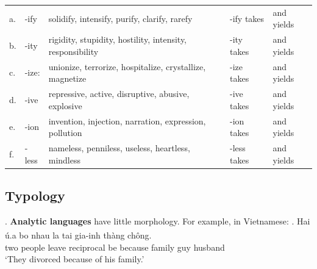 \documentclass[11pt, oneside]{article}   	%
\begin{document}
\medskip %
\begin{adjustwidth}{-0.4in}{-0.4in}%
\begin{tabular}{l l l l l}
a. & -ify	&	solidify, intensify, purify, clarify, rarefy	&	-ify takes \underline{\hspace{1cm}} & and yields \underline{\hspace{1cm}} \\
b. & -ity	&	rigidity, stupidity, hostility, intensity, responsibility	& -ity takes \underline{\hspace{1cm}} & and yields \underline{\hspace{1cm}} \\
c. & -ize:	& unionize, terrorize, hospitalize, crystallize, magnetize	& -ize takes \underline{\hspace{1cm}} & and yields \underline{\hspace{1cm}} \\
d.	& -ive & repressive, active, disruptive, abusive, explosive & -ive takes \underline{\hspace{1cm}} & and yields \underline{\hspace{1cm}} \\
e. &-ion &invention, injection, narration, expression, pollution & -ion takes \underline{\hspace{1cm}} & and yields \underline{\hspace{1cm}} \\
f. & -less & nameless, penniless, useless, heartless, mindless & -less takes \underline{\hspace{1cm}} & and yields \underline{\hspace{1cm}} \\
\end{tabular}
\end{adjustwidth}
\medskip %

\subsection{Typology}

\ex. {\bfseries Analytic languages} have little morphology. For example, in Vietnamese:
\ag. Hai \textcrd ú.a bo\textsuperscript{} nhau la tai gia-\textcrd inh thàng chông. \\
two people leave reciprocal be because family guy husband \\
`They divorced because of his family.'	
\end{document}
